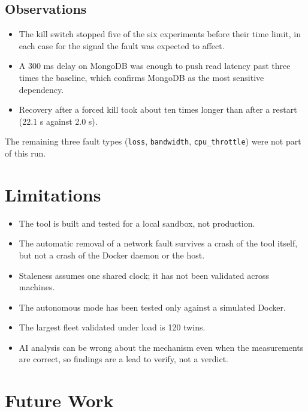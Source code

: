 \documentclass[11pt,a4paper]{article}
\begin{document}
\subsection{Observations}

\begin{itemize}
  \item The kill switch stopped five of the six experiments before their time
        limit, in each case for the signal the fault was expected to affect.
  \item A 300 ms delay on MongoDB was enough to push read latency past three
        times the baseline, which confirms MongoDB as the most sensitive
        dependency.
  \item Recovery after a forced kill took about ten times longer than after a
        restart (22.1 s against 2.0 s).
\end{itemize}

The remaining three fault types (\texttt{loss}, \texttt{bandwidth},
\texttt{cpu\_throttle}) were not part of this run.

\section{Limitations}

\begin{itemize}
  \item The tool is built and tested for a local sandbox, not production.
  \item The automatic removal of a network fault survives a crash of the tool
        itself, but not a crash of the Docker daemon or the host.
  \item Staleness assumes one shared clock; it has not been validated across
        machines.
  \item The autonomous mode has been tested only against a simulated Docker.
  \item The largest fleet validated under load is 120 twins.
  \item AI analysis can be wrong about the mechanism even when the
        measurements are correct, so findings are a lead to verify, not a
        verdict.
\end{itemize}

\section{Future Work}
\end{document}
